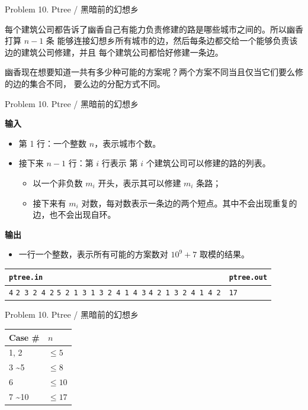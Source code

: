 \documentclass[UTF8]{beamer}
\begin{document}
\begin{frame}{Problem 10. Ptree / 黑暗前的幻想乡}

每个建筑公司都告诉了幽香自己有能力负责修建的路是哪些城市之间的。所以幽香打算 $n - 1$ 条
能够连接幻想乡所有城市的边，然后每条边都交给一个能够负责该边的建筑公司修建，并且
每个建筑公司都恰好修建一条边。

幽香现在想要知道一共有多少种可能的方案呢？两个方案不同当且仅当它们要么修的边的集合不同，
要么边的分配方式不同。

\end{frame}

\begin{frame}{Problem 10. Ptree / 黑暗前的幻想乡}

\textbf{输入}
\begin{itemize}
    \item 第 1 行：一个整数 $n$，表示城市个数。
    \item 接下来 $n - 1$ 行：第 $i$ 行表示 第 $i$ 个建筑公司可以修建的路的列表。
        \begin{itemize}
            \item 以一个非负数 $m_i$ 开头，表示其可以修建 $m_i$ 条路；
            \item 接下来有 $m_i$ 对数，每对数表示一条边的两个短点。其中不会出现重复的边，也不会出现自环。
        \end{itemize}
\end{itemize}
\textbf{输出}
\begin{itemize}
    \item 一行一个整数，表示所有可能的方案数对 $10^9 + 7$ 取模的结果。
\end{itemize}

\small{\begin{tabularx}{\textwidth}{|X|X|}
\hline
\texttt{\textbf{ptree.in}} & \texttt{\textbf{ptree.out}} \\ \hline
\texttt{4}\newline
\texttt{2 3 2 4 2}\newline
\texttt{5 2 1 3 1 3 2 4 1 4 3}\newline
\texttt{4 2 1 3 2 4 1 4 2}
&
\texttt{17}
\\ \hline
\end{tabularx}}
\newline

\end{frame}

\begin{frame}{Problem 10. Ptree / 黑暗前的幻想乡}

\begin{tabularx}{\textwidth}{X|X} \hline
Case \# & $n$ \\ \hline \hline
1, 2                 & $\leq 5$  \\ \hline
3 \textasciitilde 5  & $\leq 8$  \\ \hline
6                    & $\leq 10$ \\ \hline
7 \textasciitilde 10 & $\leq 17$ \\ \hline
\end{tabularx}

\end{frame}
\end{document}

